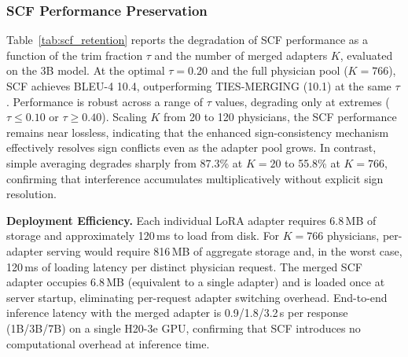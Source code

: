 \subsubsection*{SCF Performance Preservation}
Table~\ref{tab:scf_retention} reports the degradation of SCF performance as a function of the trim fraction $\tau$ and the number of merged adapters $K$, evaluated on the 3B model.
At the optimal $\tau=0.20$ and the full physician pool ($K=766$), SCF achieves BLEU-4 10.4, outperforming TIES-MERGING (10.1) at the same $\tau$.
Performance is robust across a range of $\tau$ values, degrading only at extremes ($\tau\le0.10$ or $\tau\ge0.40$).
Scaling $K$ from 20 to 120 physicians, the SCF performance remains near lossless, indicating that the enhanced sign-consistency mechanism effectively resolves sign conflicts even as the adapter pool grows.
In contrast, simple averaging degrades sharply from 87.3\% at $K=20$ to 55.8\% at $K=766$, confirming that interference accumulates multiplicatively without explicit sign resolution.

\textbf{Deployment Efficiency.} Each individual LoRA adapter requires 6.8\,MB of storage and approximately 120\,ms to load from disk.
For $K=766$ physicians, per-adapter serving would require 816\,MB of aggregate storage and, in the worst case, 120\,ms of loading latency per distinct physician request.
The merged SCF adapter occupies 6.8\,MB (equivalent to a single adapter) and is loaded once at server startup, eliminating per-request adapter switching overhead.
End-to-end inference latency with the merged adapter is 0.9/1.8/3.2\,s per response (1B/3B/7B) on a single H20-3e GPU, confirming that SCF introduces no computational overhead at inference time. 


